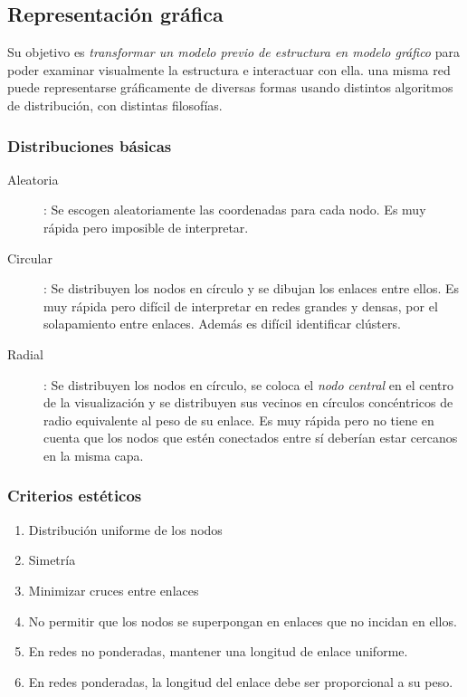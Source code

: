 \documentclass[10pt,spanish, landscape, twocolumn]{article}
\begin{document}
\subsection{\textcolor{temacuatro}Representación gráfica}
Su objetivo es \textit{\textcolor{temacuatro}{transformar un modelo previo de estructura en modelo gráfico}} para poder examinar visualmente la estructura e interactuar con ella. una misma red puede representarse gráficamente de diversas formas usando distintos algoritmos de distribución, con distintas filosofías.

\subsubsection{\textcolor{temacuatro}Distribuciones básicas}
\begin{description}
    \item[Aleatoria]: Se escogen aleatoriamente las coordenadas para cada nodo. Es muy rápida pero imposible de interpretar.
    \item[Circular]: Se distribuyen los nodos en círculo y se dibujan los enlaces entre ellos. Es muy rápida pero difícil de interpretar en redes grandes y densas, por el solapamiento entre enlaces. Además es difícil identificar clústers.
    \item[Radial]: Se distribuyen los nodos en círculo, se coloca el \textit{\textcolor{temacuatro}{nodo central}} en el centro de la visualización y se distribuyen sus vecinos en círculos concéntricos de radio equivalente al peso de su enlace. Es muy rápida pero no tiene en cuenta que los nodos que estén conectados entre sí deberían estar cercanos en la misma capa.
\end{description}

\subsubsection{\textcolor{temacuatro}Criterios estéticos}
\begin{enumerate}[\color{temacuatro}{$\clubsuit$}]
    \item Distribución uniforme de los nodos
    \item Simetría
    \item Minimizar cruces entre enlaces
    \item No permitir que los nodos se superpongan en enlaces que no incidan en ellos.
    \item En redes no ponderadas, mantener una longitud de enlace uniforme.
    \item En redes ponderadas, la longitud del enlace debe ser proporcional a su peso.
\end{enumerate}
\end{document}
